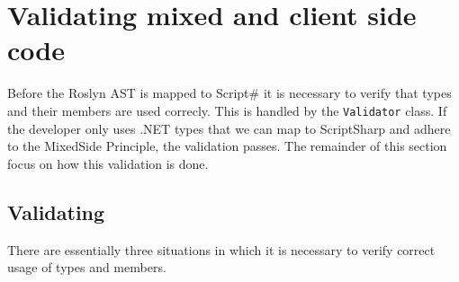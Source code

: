 \section{Validating mixed and client side code} %
\label{sec:syntax_tree_validation}

	Before the Roslyn AST is mapped to Script\# it is necessary to verify that types and their members are used correcly. This is handled by the \texttt{Validator} class. If the developer only uses .NET types that we can map to ScriptSharp and adhere to the MixedSide Principle, the validation passes. The remainder of this section focus on how this validation is done.


	\subsection{Validating} %
	\label{sub:validating}

		There are essentially three situations in which it is necessary to verify correct usage of types and members.

